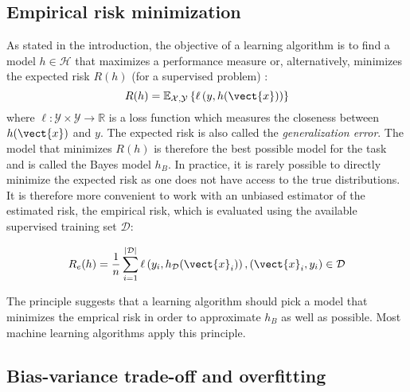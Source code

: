 \subsection{Empirical risk minimization}
\label{ssec:backml:modelselection}
As stated in the introduction, the objective of a learning algorithm is to find
a model $h \in \mathcal{H}$ that maximizes a performance measure or, alternatively,
minimizes the expected risk $R(h)$ (for a supervised problem)
\cite{vapnik1992principles}:
\begin{equation}
\label{eqn:backml:expriskmin}
R(h) = \mathbb{E}_{\mathcal{X},\mathcal{Y}}\left\{\ell\left(y, h(\vect{x})\right)\right\}
\end{equation}
where $\ell: \mathcal{Y}\times\mathcal{Y} \rightarrow \mathbb{R}$ is a loss function
which measures the closeness between $h(\vect{x})$ and $y$. The expected risk is
also called the \textit{generalization error}. The model that minimizes $R(h)$ is
therefore the best possible model for the task and is called the Bayes model $h_B$.
In practice, it is rarely possible to directly minimize the expected risk as one
does not have access to the true distributions. It is therefore more convenient
to work with an unbiased estimator of the estimated risk, the empirical risk,
which is evaluated using the available supervised training set $\mathcal{D}$:

\begin{equation}
\label{eqn:backml:empiricalrisk}
R_e(h) = \frac{1}{n} \sum_{i=1}^{|\mathcal{D}|} \ell\left(y_i, h_\mathcal{D}(\vect{x}_i)\right), (\vect{x}_i, y_i) \in \mathcal{D}
\end{equation}

The  principle suggests that a learning algorithm should pick a
model that minimizes the emprical risk in order to approximate $h_B$ as well as
possible. Most machine learning algorithms apply this principle.

\subsection{Bias-variance trade-off and overfitting}
\label{ssec:backml:bvtradeoff}

